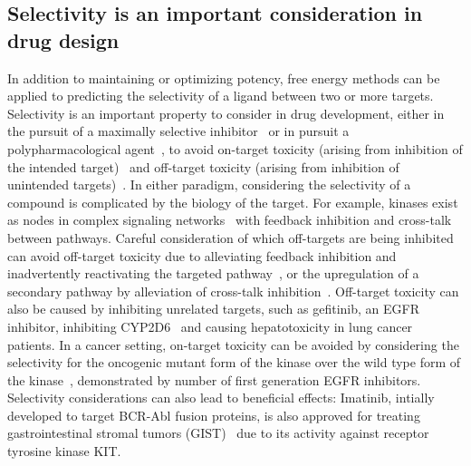 \documentclass[phd,tocprelim]{cornell}
\begin{document}
\subsection{Selectivity is an important consideration in drug design}
In addition to maintaining or optimizing potency, free energy methods can be applied to predicting the selectivity of a ligand between two or more targets. Selectivity is an important property to consider in drug development, either in the pursuit of a maximally selective inhibitor~\citep{Zhang2009-il,Huggins2012-hr} or in pursuit a polypharmacological agent~\citep{Fan2007-hm,Apsel2008-it,Knight:Nat.Rev.Cancer:2010,Hopkins2006-qu,Hopkins2008-ij}, to avoid on-target toxicity (arising from inhibition of the intended target)~\citep{Rudmann2013-hi}  and off-target toxicity (arising from inhibition of unintended targets)~\citep{Kijima2011-xs,Liu2014-yi}. In either paradigm, considering the selectivity of a compound is complicated by the biology of the target. For example, kinases exist as nodes in complex signaling networks~\citep{Mendoza2011-bj,Tricker2015-xx} with feedback inhibition and cross-talk between pathways. Careful consideration of which off-targets are being inhibited can avoid off-target toxicity due to alleviating feedback inhibition and inadvertently reactivating the targeted pathway~\citep{Mendoza2011-bj,Tricker2015-xx}, or the upregulation of a secondary pathway by alleviation of cross-talk inhibition~\citep{Bailey2014-pd,Chandarlapaty:CancerCell:2011}. Off-target toxicity can also be caused by inhibiting unrelated targets, such as gefitinib, an EGFR inhibitor, inhibiting CYP2D6~\citep{Kijima2011-xs} and causing hepatotoxicity in lung cancer patients. In a cancer setting, on-target toxicity can be avoided by considering the selectivity for the oncogenic mutant form of the kinase over the wild type form of the kinase~\citep{Pao2004-kx,Kim2012-mo,Juchum:DrugResist.Updat.:2015}, demonstrated by number of first generation EGFR inhibitors. Selectivity considerations can also lead to beneficial effects: Imatinib, intially developed to target BCR-Abl fusion proteins, is also approved for treating gastrointestinal stromal tumors (GIST)~\citep{Din2008-ag} due to its activity against receptor tyrosine kinase KIT. 
\end{document}
